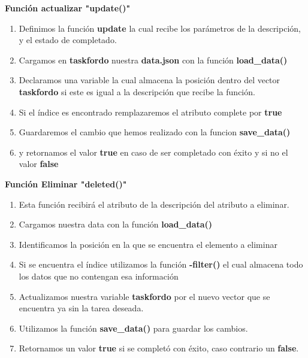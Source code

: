 \documentclass{report}
\begin{document}
\textbf{Función actualizar "update()"}

\begin{enumerate}
  \item Definimos la función \textbf{update} la cual recibe los parámetros de la descripción, y el estado de completado.
  \item Cargamos en \textbf{taskfordo} nuestra \textbf{data.json} con la función \textbf{load\_data()}
  \item Declaramos una variable la cual almacena la posición dentro del vector \textbf{taskfordo} si este es igual a la descripción que recibe la función.
  \item Si el índice es encontrado remplazaremos el atributo complete por \textbf{true}  
  \item Guardaremos el cambio que hemos realizado con la funcion \textbf{save\_data()}
  \item y retornamos el valor \textbf{true} en caso de ser completado con éxito y si no el valor \textbf{false}
\end{enumerate}

\textbf{Función Eliminar "deleted()"}

\begin{enumerate}
  \item Esta función recibirá el atributo de la descripción del atributo a eliminar.
  \item Cargamos nuestra data con la función \textbf{load\_data()}
  \item Identificamos la posición en la que se encuentra el elemento a eliminar
  \item Si se encuentra el índice utilizamos la función \textbf{-filter()} el cual almacena todo los datos que no contengan esa información
  \item Actualizamos nuestra variable \textbf{taskfordo} por el nuevo vector que se encuentra ya sin la tarea deseada.
  \item Utilizamos la función \textbf{save\_data()} para guardar los cambios.
  \item Retornamos un valor \textbf{true} si se completó con éxito, caso contrario un \textbf{false}.
\end{enumerate}
\end{document}
